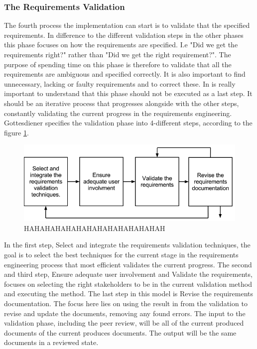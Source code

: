 \documentclass[a4paper]{article}
\begin{document}
\subsubsection{The Requirements Validation}
\label{subsub:the_requirements_validation}
The fourth process the implementation can start is to validate that the specified requirements. In difference to the different validation steps in the other phases this phase focuses on how the requirements are specified. I.e "Did we get the requirements right?" rather than "Did we get the right requirement?". The purpose of spending time on this phase is therefore to validate that all the requirements are ambiguous and specified correctly. It is also important to find unnecessary, lacking or faulty requirements and to correct these\cite{gott261262}. In is really important to understand that this phase should not be executed as a last step. It  should be an iterative process that progresses alongside with the other steps, constantly validating the current progress in the requirements engineering\cite{gott261262}. Gottesdiener specifies the validation phase into 4-different steps, according to the figure \ref{figure:validation}\cite{gott261262}. 


\begin{figure}[!ht]
	\centering
		\includegraphics[width=1\textwidth]{images/validations_model.png}
	\caption{HAHAHAHAHAHAHAHAHAHAHAHAHAH}
	\label{figure:validation}
\end{figure}


In the first step, Select and integrate the requirements validation techniques, the goal is to select the best techniques for the current stage in the requirements engineering process that most efficient validates the current progress. The second and third step, Ensure adequate user involvement and Validate the requirements, focuses on selecting the right stakeholders to be in the current validation method and executing the method. The last step in this model is Revise the requirements documentation. The focus here lies on using the result in from the validation to revise and update the documents, removing any found errors. The input to the validation phase, including the peer review, will be all of the current produced documents of the current produces documents. The output will be the same documents in a reviewed state\cite{gott261263}.
\end{document}
